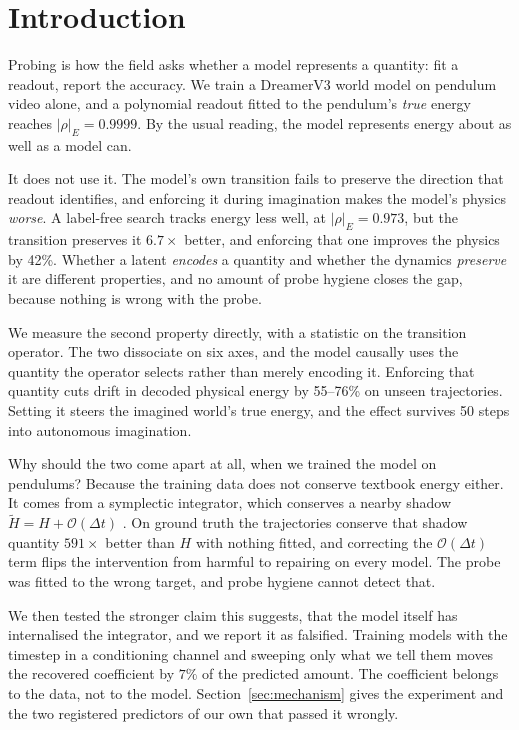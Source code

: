 \section{Introduction}
\label{sec:intro}

Probing is how the field asks whether a model represents a quantity: fit a readout, report the
accuracy. We train a DreamerV3 world model on pendulum video alone, and a polynomial readout fitted
to the pendulum's \emph{true} energy reaches $|\rho|_E = 0.9999$. By the usual reading, the model
represents energy about as well as a model can.

It does not use it. The model's own transition fails to preserve the direction that readout
identifies, and enforcing it during imagination makes the model's physics \emph{worse}. A label-free
search tracks energy less well, at $|\rho|_E = 0.973$, but the transition preserves it $6.7\times$
better, and enforcing that one improves the physics by 42\%. Whether a latent \emph{encodes} a
quantity and whether the dynamics \emph{preserve} it are different properties, and no amount of probe
hygiene closes the gap, because nothing is wrong with the probe.

We measure the second property directly, with a statistic on the transition operator. The two
dissociate on six axes, and the model causally uses the quantity the operator selects rather than
merely encoding it. Enforcing that quantity cuts drift in decoded physical energy by 55--76\% on
unseen trajectories. Setting it steers the imagined world's true energy, and the effect survives 50
steps into autonomous imagination.

Why should the two come apart at all, when we trained the model on pendulums? Because the training
data does not conserve textbook energy either. It comes from a symplectic integrator, which conserves
a nearby shadow $\tilde H = H + \mathcal{O}(\Delta t)$ \citep{hairer2006geometric}. On ground truth
the trajectories conserve that shadow quantity $591\times$ better than $H$ with nothing fitted, and
correcting the $\mathcal{O}(\Delta t)$ term flips the intervention from harmful to repairing on every
model. The probe was fitted to the wrong target, and probe hygiene cannot detect that.

We then tested the stronger claim this suggests, that the model itself has internalised the
integrator, and we report it as falsified. Training models with the timestep in a conditioning
channel and sweeping only what we tell them moves the recovered coefficient by $7\%$ of the predicted
amount. The coefficient belongs to the data, not to the model. Section~\ref{sec:mechanism} gives the
experiment and the two registered predictors of our own that passed it wrongly.

